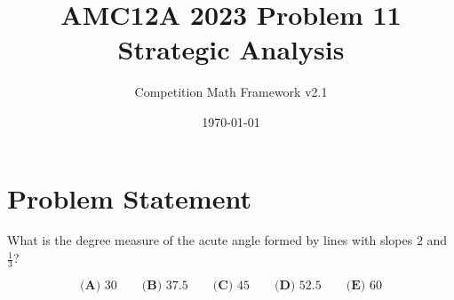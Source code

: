 \documentclass[12pt]{article}
\begin{document}
\title{AMC12A 2023 Problem 11\\Strategic Analysis}
\author{Competition Math Framework v2.1}
\date{\today}
\maketitle

\section*{Problem Statement}

What is the degree measure of the acute angle formed by lines with slopes $2$ and $\frac{1}{3}$?

$$\textbf{(A) }30\qquad\textbf{(B) }37.5\qquad\textbf{(C) }45\qquad\textbf{(D) }52.5\qquad\textbf{(E) }60$$
\end{document}
